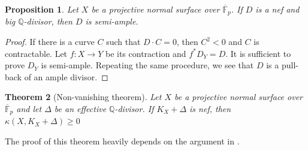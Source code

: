 \documentclass[12pt,twoside]{amsart}
\newtheorem{thm}{Theorem}[section]
\newtheorem{prop}[thm]{Proposition}
\theoremstyle{definition}
\newcommand{\Q}{$\mathbb{Q}$}
\begin{document}
\begin{prop}\label{fpnefbig}
Let $X$ be a projective normal surface over $\overline{\mathbb{F}}_p$. 
If $D$ is a nef and big \Q-divisor, then $D$ is semi-ample.
\end{prop}

\begin{proof}
If there is a curve $C$ such that $D\cdot C=0$, 
then $C^2<0$ and $C$ is contractable. 
Let $f:X \to Y$ be its contraction and $f^*D_Y=D$. 
It is sufficient to prove $D_Y$ is semi-ample. 
Repeating the same procedure, 
we see that $D$ is a pull-back of an ample divisor.
\end{proof}


\begin{thm}[Non-vanishing theorem]\label{fpnonvanishing}
Let $X$ be a projective normal surface over $\overline{\mathbb{F}}_p$ and 
let $\Delta$ be an effective \Q-divisor. 
If $K_X+\Delta$ is nef, then $\kappa(X, K_X+\Delta) \geq 0$
\end{thm}

The proof of this theorem heavily depends on the argument in \cite{Masek}.
\end{document}
